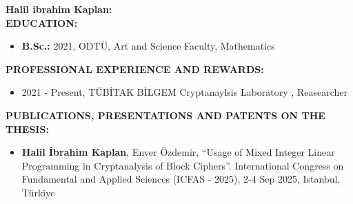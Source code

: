 \vspace{10mm}



\textbf{Halil ibrahim Kaplan:} \\




\textbf{EDUCATION:} 
\vspace{-3mm}
\begin{itemize}
  \item \textbf{B.Sc.:} 2021, ODTÜ, Art and Science Faculty, Mathematics
  
\end{itemize}

\textbf{PROFESSIONAL EXPERIENCE AND REWARDS:}   
\vspace{-3mm}
\begin{itemize}
  \item 2021 - Present, TÜBİTAK BİLGEM Cryptanaylsis Laboratory , Reasearcher 
\end{itemize}

\textbf{PUBLICATIONS, PRESENTATIONS AND PATENTS ON THE THESIS:} 
\vspace{-3mm}
\begin{itemize}
  \item \textbf{Halil İbrahim Kaplan}, Enver Özdemir, “Usage of Mixed Integer Linear
Programming in Cryptanalysis of Block Ciphers”. International Congress on Fundamental and Applied Sciences (ICFAS - 2025), 2-4 Sep 2025, Istanbul, Türkiye 
\end{itemize}


